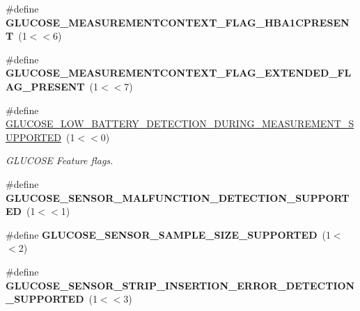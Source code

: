 \begin{DoxyCompactItemize}
\item 
\#define {\bfseries G\+L\+U\+C\+O\+S\+E\+\_\+\+M\+E\+A\+S\+U\+R\+E\+M\+E\+N\+T\+C\+O\+N\+T\+E\+X\+T\+\_\+\+F\+L\+A\+G\+\_\+\+H\+B\+A1\+C\+P\+R\+E\+S\+E\+NT}~(1$<$$<$6)\hypertarget{group___b_l_e___g_s_gaac26ca00a87c2d3c7e10df814b522d01}{}\label{group___b_l_e___g_s_gaac26ca00a87c2d3c7e10df814b522d01}

\item 
\#define {\bfseries G\+L\+U\+C\+O\+S\+E\+\_\+\+M\+E\+A\+S\+U\+R\+E\+M\+E\+N\+T\+C\+O\+N\+T\+E\+X\+T\+\_\+\+F\+L\+A\+G\+\_\+\+E\+X\+T\+E\+N\+D\+E\+D\+\_\+\+F\+L\+A\+G\+\_\+\+P\+R\+E\+S\+E\+NT}~(1$<$$<$7)\hypertarget{group___b_l_e___g_s_ga024434a2fa5c29c85181e695cd5c4c43}{}\label{group___b_l_e___g_s_ga024434a2fa5c29c85181e695cd5c4c43}

\item 
\#define \hyperlink{group___b_l_e___g_s_ga77c005f74705959bcd25d440b02e4a96}{G\+L\+U\+C\+O\+S\+E\+\_\+\+L\+O\+W\+\_\+\+B\+A\+T\+T\+E\+R\+Y\+\_\+\+D\+E\+T\+E\+C\+T\+I\+O\+N\+\_\+\+D\+U\+R\+I\+N\+G\+\_\+\+M\+E\+A\+S\+U\+R\+E\+M\+E\+N\+T\+\_\+\+S\+U\+P\+P\+O\+R\+T\+ED}~(1$<$$<$0)\hypertarget{group___b_l_e___g_s_ga77c005f74705959bcd25d440b02e4a96}{}\label{group___b_l_e___g_s_ga77c005f74705959bcd25d440b02e4a96}

\begin{DoxyCompactList}\small\item\em G\+L\+U\+C\+O\+SE Feature flags. \end{DoxyCompactList}\item 
\#define {\bfseries G\+L\+U\+C\+O\+S\+E\+\_\+\+S\+E\+N\+S\+O\+R\+\_\+\+M\+A\+L\+F\+U\+N\+C\+T\+I\+O\+N\+\_\+\+D\+E\+T\+E\+C\+T\+I\+O\+N\+\_\+\+S\+U\+P\+P\+O\+R\+T\+ED}~(1$<$$<$1)\hypertarget{group___b_l_e___g_s_ga5e3c9e47093fc773e80c0c35ce22dcee}{}\label{group___b_l_e___g_s_ga5e3c9e47093fc773e80c0c35ce22dcee}

\item 
\#define {\bfseries G\+L\+U\+C\+O\+S\+E\+\_\+\+S\+E\+N\+S\+O\+R\+\_\+\+S\+A\+M\+P\+L\+E\+\_\+\+S\+I\+Z\+E\+\_\+\+S\+U\+P\+P\+O\+R\+T\+ED}~(1$<$$<$2)\hypertarget{group___b_l_e___g_s_ga3631be0214e91429c745100af7d89081}{}\label{group___b_l_e___g_s_ga3631be0214e91429c745100af7d89081}

\item 
\#define {\bfseries G\+L\+U\+C\+O\+S\+E\+\_\+\+S\+E\+N\+S\+O\+R\+\_\+\+S\+T\+R\+I\+P\+\_\+\+I\+N\+S\+E\+R\+T\+I\+O\+N\+\_\+\+E\+R\+R\+O\+R\+\_\+\+D\+E\+T\+E\+C\+T\+I\+O\+N\+\_\+\+S\+U\+P\+P\+O\+R\+T\+ED}~(1$<$$<$3)\hypertarget{group___b_l_e___g_s_gac9fc7244a22056ede57d7d28908c1718}{}\label{group___b_l_e___g_s_gac9fc7244a22056ede57d7d28908c1718}


\end{DoxyCompactItemize}
